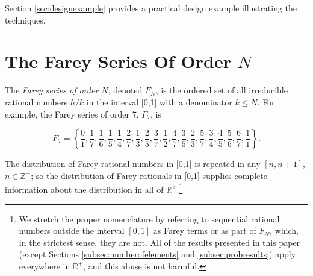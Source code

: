 \documentclass{esub2acm}
\newcommand{\realsetnonneg}{{\mathbb{R}^+}}
\newcommand{\intsetnonneg}{{\mathbb{Z}^+}}
\begin{document}
Section \ref{sec:designexample} provides a practical design
example illustrating the techniques.


\section{The Farey Series Of Order $N$}
\label{sec:fareyseries}

The \emph{Farey series
of order $N$}, denoted $F_{N}$,
is the ordered set of all irreducible
rational numbers $h/k$ in the interval
[0,1]
with a denominator $k\leq N$.
For example, the Farey series of
order 7, $F_7$, is

\begin{equation}
\label{eq:eq0045}
F_7  = \left\{ {\frac{0}{1},\frac{1}{7},\frac{1}{6},
                \frac{1}{5},\frac{1}{4},\frac{2}{7},
                \frac{1}{3},\frac{2}{5},\frac{3}{7},\frac{1}{2},\frac{4}{7},
                \frac{3}{5},\frac{2}{3},\frac{5}{7},\frac{3}{4},
                \frac{4}{5},\frac{5}{6},\frac{6}{7},\frac{1}{1}} \right\}.
\end{equation}

The distribution of Farey rational numbers in
[0,1] is repeated
in any
$[n,n+1]$, $n\in \intsetnonneg$; so the distribution of
Farey rationals in [0,1] supplies complete
information about the distribution in
all of $\realsetnonneg$.\footnote{We
stretch the proper nomenclature by referring
to sequential rational numbers outside the
interval $[0,1]$ as Farey terms or as part of
$F_N$, which, in the strictest sense, they are not.
All of the results presented in
this paper (except Sections \ref{subsec:numberofelements} and \ref{subsec:probresults}) apply
everywhere in $\realsetnonneg$, and this abuse
is not harmful.}

\end{document}
